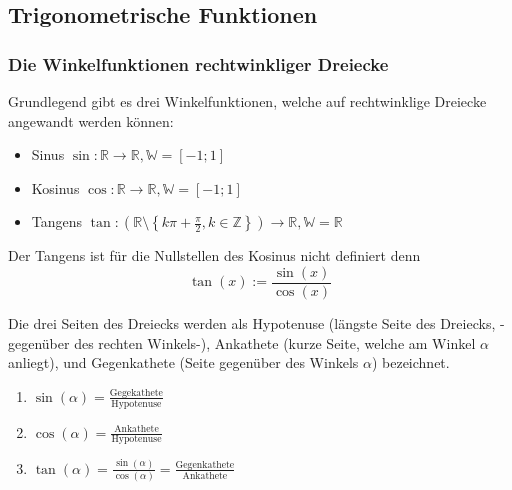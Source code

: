 \subsection{Trigonometrische Funktionen}
\subsubsection{Die Winkelfunktionen rechtwinkliger Dreiecke}
Grundlegend gibt es drei Winkelfunktionen, welche auf rechtwinklige Dreiecke angewandt werden können:
\begin{itemize}
\item Sinus $\sin : \mathbb{R} \to \mathbb{R}, \mathbb{W} = \left[-1;1 \right]$
\item Kosinus $\cos : \mathbb{R} \to \mathbb{R}, \mathbb{W} = \left[ -1;1 \right]$
\item Tangens $\tan : \left( \mathbb{R} \setminus \left\{ k \pi + \frac{\pi}{2}, k \in \mathbb{Z} \right\} \right) \to \mathbb{R}, \mathbb{W} = \mathbb{R}$
\end{itemize}
\begin{warning}
	Der Tangens ist für die Nullstellen des Kosinus nicht definiert denn
	\begin{equation*}
	\tan(x) := \frac{\sin(x)}{\cos(x)}
	\end{equation*}
\end{warning}
Die drei Seiten des Dreiecks werden als Hypotenuse (längste Seite des Dreiecks, -gegenüber des rechten Winkels-), Ankathete (kurze Seite, welche am Winkel $\alpha$ anliegt), und Gegenkathete (Seite gegenüber des Winkels $\alpha$) bezeichnet.
\begin{minipage}{0.45\textwidth}
\hfill
\begin{enumerate}
\item $\sin(\alpha)=\frac{\text{Gegekathete}}{\text{Hypotenuse}}$
\item $\cos(\alpha)=\frac{\text{Ankathete}}{\text{Hypotenuse}}$
\item $\tan(\alpha)=\frac{\sin(\alpha)}{\cos(\alpha)}= \frac{\text{Gegenkathete}}{\text{Ankathete}}$
\end{enumerate}
\end{minipage}
